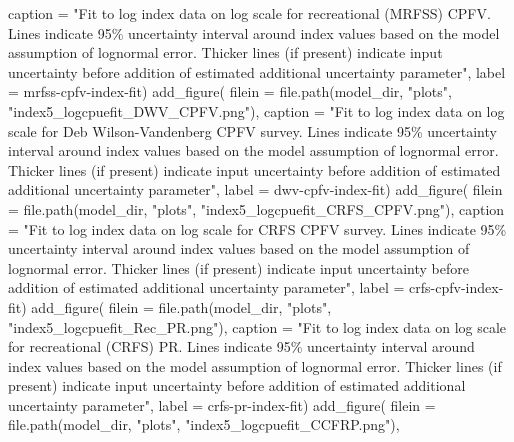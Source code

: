 \documentclass[
  letterpaper,
]{article}
\newenvironment{Shaded}{\begin{snugshade}}{\end{snugshade}}
\newcommand{\AttributeTok}[1]{\textcolor[rgb]{0.77,0.63,0.00}{#1}}
\newcommand{\FunctionTok}[1]{\textcolor[rgb]{0.00,0.00,0.00}{#1}}
\newcommand{\NormalTok}[1]{#1}
\newcommand{\StringTok}[1]{\textcolor[rgb]{0.31,0.60,0.02}{#1}}
\begin{document}
\begin{Shaded}
\begin{Highlighting}[]
\AttributeTok{caption =} \StringTok{"Fit to log index data on log scale for recreational (MRFSS) CPFV. Lines indicate 95\% uncertainty interval around index values based on the model assumption of lognormal error. Thicker lines (if present) indicate input uncertainty before addition of estimated additional uncertainty parameter"}\NormalTok{,}
\AttributeTok{label =} \StringTok{\textquotesingle{}mrfss{-}cpfv{-}index{-}fit\textquotesingle{}}\NormalTok{)}
\FunctionTok{add\_figure}\NormalTok{(}
\AttributeTok{filein =} \FunctionTok{file.path}\NormalTok{(model\_dir, }\StringTok{"plots"}\NormalTok{, }\StringTok{"index5\_logcpuefit\_DWV\_CPFV.png"}\NormalTok{), }
\AttributeTok{caption =} \StringTok{"Fit to log index data on log scale for Deb Wilson{-}Vandenberg CPFV survey. Lines indicate 95\% uncertainty interval around index values based on the model assumption of lognormal error. Thicker lines (if present) indicate input uncertainty before addition of estimated additional uncertainty parameter"}\NormalTok{,}
\AttributeTok{label =} \StringTok{\textquotesingle{}dwv{-}cpfv{-}index{-}fit\textquotesingle{}}\NormalTok{)}
\FunctionTok{add\_figure}\NormalTok{(}
\AttributeTok{filein =} \FunctionTok{file.path}\NormalTok{(model\_dir, }\StringTok{"plots"}\NormalTok{, }\StringTok{"index5\_logcpuefit\_CRFS\_CPFV.png"}\NormalTok{), }
\AttributeTok{caption =} \StringTok{"Fit to log index data on log scale for CRFS CPFV survey. Lines indicate 95\% uncertainty interval around index values based on the model assumption of lognormal error. Thicker lines (if present) indicate input uncertainty before addition of estimated additional uncertainty parameter"}\NormalTok{,}
\AttributeTok{label =} \StringTok{\textquotesingle{}crfs{-}cpfv{-}index{-}fit\textquotesingle{}}\NormalTok{)}
\FunctionTok{add\_figure}\NormalTok{(}
\AttributeTok{filein =} \FunctionTok{file.path}\NormalTok{(model\_dir, }\StringTok{"plots"}\NormalTok{, }\StringTok{"index5\_logcpuefit\_Rec\_PR.png"}\NormalTok{), }
\AttributeTok{caption =} \StringTok{"Fit to log index data on log scale for recreational (CRFS) PR. Lines indicate 95\% uncertainty interval around index values based on the model assumption of lognormal error. Thicker lines (if present) indicate input uncertainty before addition of estimated additional uncertainty parameter"}\NormalTok{,}
\AttributeTok{label =} \StringTok{\textquotesingle{}crfs{-}pr{-}index{-}fit\textquotesingle{}}\NormalTok{)}
\FunctionTok{add\_figure}\NormalTok{(}
\AttributeTok{filein =} \FunctionTok{file.path}\NormalTok{(model\_dir, }\StringTok{"plots"}\NormalTok{, }\StringTok{"index5\_logcpuefit\_CCFRP.png"}\NormalTok{), }

\end{Highlighting}
\end{Shaded}
\end{document}
